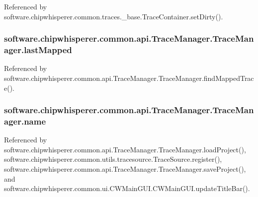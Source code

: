 Referenced by software.\+chipwhisperer.\+common.\+traces.\+\_\+base.\+Trace\+Container.\+set\+Dirty().

\hypertarget{classsoftware_1_1chipwhisperer_1_1common_1_1api_1_1TraceManager_1_1TraceManager_a0ae4576b6dcfae006a6cc4a176398998}{}
\subsubsection[{last\+Mapped}]{\setlength{\rightskip}{0pt plus 5cm}software.\+chipwhisperer.\+common.\+api.\+Trace\+Manager.\+Trace\+Manager.\+last\+Mapped}\label{classsoftware_1_1chipwhisperer_1_1common_1_1api_1_1TraceManager_1_1TraceManager_a0ae4576b6dcfae006a6cc4a176398998}


Referenced by software.\+chipwhisperer.\+common.\+api.\+Trace\+Manager.\+Trace\+Manager.\+find\+Mapped\+Trace().

\hypertarget{classsoftware_1_1chipwhisperer_1_1common_1_1api_1_1TraceManager_1_1TraceManager_a281ad58f0abdb465d15bf878e27dee73}{}
\subsubsection[{name}]{\setlength{\rightskip}{0pt plus 5cm}software.\+chipwhisperer.\+common.\+api.\+Trace\+Manager.\+Trace\+Manager.\+name}\label{classsoftware_1_1chipwhisperer_1_1common_1_1api_1_1TraceManager_1_1TraceManager_a281ad58f0abdb465d15bf878e27dee73}


Referenced by software.\+chipwhisperer.\+common.\+api.\+Trace\+Manager.\+Trace\+Manager.\+load\+Project(), software.\+chipwhisperer.\+common.\+utils.\+tracesource.\+Trace\+Source.\+register(), software.\+chipwhisperer.\+common.\+api.\+Trace\+Manager.\+Trace\+Manager.\+save\+Project(), and software.\+chipwhisperer.\+common.\+ui.\+C\+W\+Main\+G\+U\+I.\+C\+W\+Main\+G\+U\+I.\+update\+Title\+Bar().

